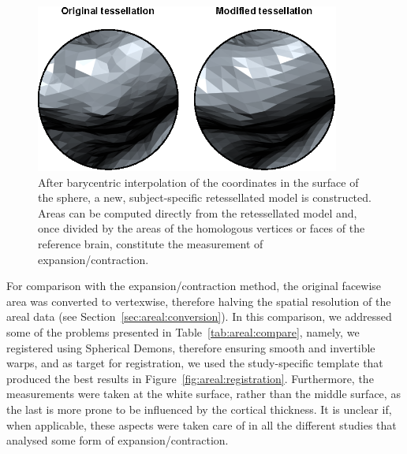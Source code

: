 \begin{figure}[!tbp]  %
\centering
\includegraphics[width=10cm]{images/retessellate.eps}
\caption[Example of a retessellated surface.]{After barycentric interpolation of the coordinates in the surface of the sphere, a new, subject-specific retessellated model is constructed. Areas can be computed directly from the retessellated model and, once divided by the areas of the homologous vertices or faces of the reference brain, constitute the measurement of expansion/contraction.}
\label{fig:areal:retessellate}
\end{figure}

For comparison with the expansion/contraction method, the original facewise area was converted to vertexwise, therefore halving the spatial resolution of the areal data (see Section~\ref{sec:areal:conversion}). In this comparison, we addressed some of the problems presented in Table~\ref{tab:areal:compare}, namely, we registered using Spherical Demons, therefore ensuring smooth and invertible warps, and as target for registration, we used the study-specific template that produced the best results in Figure~\ref{fig:areal:registration}. Furthermore, the measurements were taken at the white surface, rather than the middle surface, as the last is more prone to be influenced by the cortical thickness. It is unclear if, when applicable, these aspects were taken care of in all the different studies that analysed some form of expansion/contraction.

